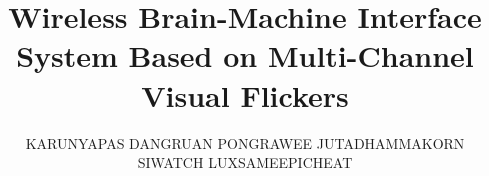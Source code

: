 \documentclass[a4paper,12pt,twoside]{report}
\begin{document}
\title{\LARGE {\bf Wireless Brain-Machine Interface System Based on Multi-Channel Visual Flickers}\\
 \vspace*{6mm}
}

\author{KARUNYAPAS DANGRUAN\newline
 		PONGRAWEE JUTADHAMMAKORN\newline
        SIWATCH \hspace{1cm}   LUXSAMEEPICHEAT}
        

\normallinespacing
\maketitle
\preface


%
%

\body










\appendix




\end{document}
